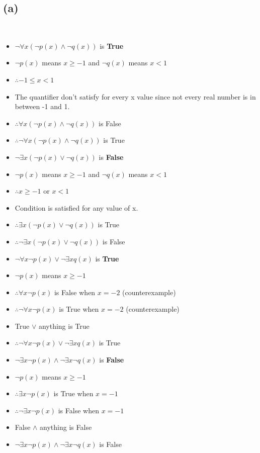 \documentclass[a4paper,12pt]{article}
\begin{document}
\subsection{(a)}
\,

\begin{itemize}
    \item[( i )] $\neg \forall x(\neg p(x) \land \neg q(x))$ is \textbf{True}
    \item[] $\neg p(x)$ means $x \geq -1$ and $\neg q(x)$ means $ x < 1$
    \item [] $\therefore -1 \leq x < 1$
    \item[] The quantifier don't satisfy for every x value since not every real number is in between -1 and 1.
    \item[] $\therefore \forall x(\neg p(x) \land \neg q(x))$ is False
    \item[] $\therefore \neg \forall x(\neg p(x) \land \neg q(x))$ is True\\
    
    \item[( ii )] $\neg \exists x(\neg p(x) \lor \neg q(x))$ is \textbf{False}
    \item[] $\neg p(x)$ means $x \geq -1$ and $\neg q(x)$ means $ x < 1$
    \item [] $\therefore x \geq -1$ or $ x < 1$
    \item[] Condition is satisfied for any value of x.
    \item[] $\therefore \exists x(\neg p(x) \lor \neg q(x))$ is True
    \item[] $\therefore \neg \exists x(\neg p(x) \lor \neg q(x))$ is False\\
    
    \item[( iii )] $\neg \forall x\neg p(x) \lor \neg \exists xq(x)$ is \textbf{True}
    \item[] $\neg p(x)$ means $x \geq -1$
    \item [] $\therefore \forall x \neg p(x)$ is False when $x = -2$ (counterexample)
    \item [] $\therefore \neg \forall x \neg p(x)$ is True when $x = -2$ (counterexample)
    \item[] True $\lor$ anything is True
    \item[] $\therefore \neg \forall x\neg p(x) \lor \neg \exists xq(x)$ is True \\ 
    
    \item[( iv )] $\neg \exists x\neg p(x) \land \neg \exists x \neg q(x)$ is \textbf{False}
    \item[] $\neg p(x)$ means $x \geq -1$
    \item [] $\therefore \exists x \neg p(x)$ is True when $x = -1$
    \item [] $\therefore \neg \exists x \neg p(x)$ is False when $x = -1$
    \item[] False $\land$ anything is False
    \item[] $\neg \exists x\neg p(x) \land \neg \exists x \neg q(x)$ is False \\
\end{itemize}
\end{document}
